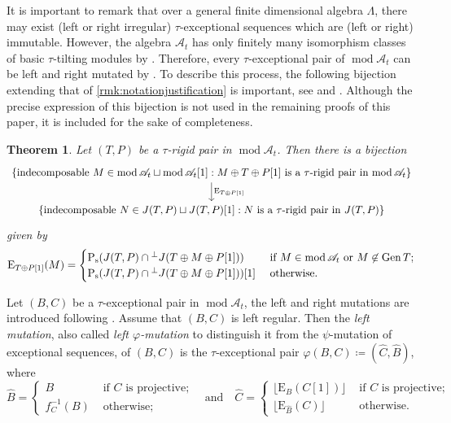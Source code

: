 \documentclass[10pt,twoside, a4paper,reqno]{amsart}
\DeclareMathOperator{\mods}{mod}
\DeclareMathOperator{\Gen}{Gen}
\newcommand{\A}{\mathscr{A}}
\newcommand{\Prm}{\mathrm{P}}
\newcommand{\ssplit}{\textnormal{s}}
\newcommand{\Erm}{\mathrm{E}}
\newtheorem{theorem}{Theorem}[section]
\theoremstyle{definition}
\begin{document}
It is important to remark that over a general finite dimensional algebra $\Lambda$, there may exist (left or right irregular) $\tau$-exceptional sequences which are (left or right) immutable. However, the algebra $\A_t$ has only finitely many isomorphism classes of basic $\tau$-tilting modules by \cite[Thm. 1.2]{IyamaZhang2020}. Therefore, every $\tau$-exceptional pair of $\mods \A_t$ can be left and right mutated by \cite[Thm. 0.2]{BHM2024}. To describe this process, the following bijection extending that of \cref{rmk:notationjustification} is important, see \cite[Prop. 5.6]{BuanMarsh2018t} and \cite[Sec. 3]{BuanHanson2023}. Although the precise expression of this bijection is not used in the remaining proofs of this paper, it is included for the sake of completeness.

\begin{theorem}\cite[Thm. 2.16]{BHM2024}
	Let $(T,P)$ be a $\tau$-rigid pair in $\mods \A_t$. Then there is a bijection
	\[ \begin{tikzcd}
	 \{ \text{indecomposable } M \in \mods \A_t \sqcup \mods \A_t[1]: M \oplus T \oplus P[1] \text{ is a $\tau$-rigid pair in $\mods \A_t$} \} \arrow[d, "\Erm_{T \oplus P[1] }"] \\
	 \{ \text{indecomposable } N \in J(T,P) \sqcup J(T,P)[1]: N \text{ is a $\tau$-rigid pair in $J(T,P)$} \}
	 \end{tikzcd}
	 \]
	 given by
	 \[ \Erm_{T \oplus P[1]}(M) = \begin{cases}  \Prm_{\ssplit}(J(T,P) \cap {}^\perp J(T \oplus M \oplus P[1])) & \text{ if $M \in \mods \A_t$ or $M \not \in \Gen T$;}\\
	 \Prm_{\ssplit}(J(T,P) \cap {}^\perp J(T \oplus M \oplus P[1]))[1] & \text{ otherwise.}  \end{cases} \]
\end{theorem}

Let $(B,C)$ be a $\tau$-exceptional pair in $\mods \A_t$, the left and right mutations are introduced following \cite[Sec. 4]{BHM2024}. Assume that $(B,C)$ is left regular. Then the \textit{left mutation}, also called \textit{left $\varphi$-mutation} to distinguish it from the $\psi$-mutation of exceptional sequences, of $(B,C)$ is the $\tau$-exceptional pair $\varphi(B,C) \coloneqq (\widehat{C}, \widehat{B})$, where 
\[ \widehat{B} = \begin{cases} B & \text{ if $C$ is projective;} \\ f_C^{-1}(B) & \text{ otherwise;} \end{cases} \quad \text{and} \quad \widehat{C} = \begin{cases} \lfloor \Erm_{B}(C[1]) \rfloor & \text{ if $C$ is projective;} \\ \lfloor \Erm_{\widehat{B}}(C) \rfloor & \text{ otherwise.} \end{cases} \]
\end{document}
